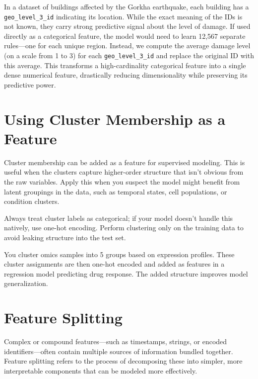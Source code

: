 \documentclass[12pt,openany]{book}
\begin{document}
\begin{examplebox}
In a dataset of buildings affected by the Gorkha earthquake, each building has a \texttt{geo\_level\_3\_id} indicating its location. While the exact meaning of the IDs is not known, they carry strong predictive signal about the level of damage. If used directly as a categorical feature, the model would need to learn 12,567 separate rules—one for each unique region. Instead, we compute the average damage level (on a scale from 1 to 3) for each \texttt{geo\_level\_3\_id} and replace the original ID with this average. This transforms a high-cardinality categorical feature into a single dense numerical feature, drastically reducing dimensionality while preserving its predictive power.
\end{examplebox}


\section{Using Cluster Membership as a Feature}

Cluster membership can be added as a feature for supervised modeling. This is useful when the clusters capture higher-order structure that isn't obvious from the raw variables. Apply this when you suspect the model might benefit from latent groupings in the data, such as temporal states, cell populations, or condition clusters.

Always treat cluster labels as categorical; if your model doesn’t handle this natively, use one-hot encoding. Perform clustering only on the training data to avoid leaking structure into the test set.

\begin{examplebox}
You cluster omics samples into 5 groups based on expression profiles. These cluster assignments are then one-hot encoded and added as features in a regression model predicting drug response. The added structure improves model generalization.
\end{examplebox}



\section{Feature Splitting}

Complex or compound features—such as timestamps, strings, or encoded identifiers—often contain multiple sources of information bundled together. Feature splitting refers to the process of decomposing these into simpler, more interpretable components that can be modeled more effectively.
\end{document}

